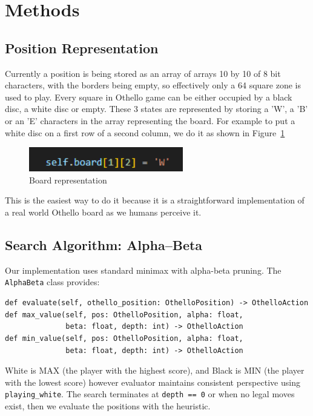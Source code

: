 \documentclass[10pt, titlepage, oneside, a4paper]{article}
\begin{document}
\section{Methods}
\label{sec:methods}


\subsection{Position Representation}
Currently a position is being stored as an array of arrays 10 by 10 of 8 bit characters, with the borders being empty, so effectively only a 64 square zone is used to play. 
Every square in Othello game can be either occupied by a black disc, a white disc or empty. These 3 states are represented by storing a 'W', a 'B' or an 'E' characters in the array representing the board.
For example to put a white disc on a first row of a second column, we do it as shown in Figure~\ref{fig:board_representation}
\begin{figure}[h]
    \centering
    \includegraphics[width=0.6\textwidth]{img/board_representation}
    \caption{Board representation}
    \label{fig:board_representation}
\end{figure}
This is the easiest way to do it because it is a straightforward implementation of a real world Othello board as we humans perceive it. 

\subsection{Search Algorithm: Alpha--Beta}

Our implementation uses standard minimax with alpha-beta pruning. The \texttt{AlphaBeta} class provides:
\begin{verbatim}
def evaluate(self, othello_position: OthelloPosition) -> OthelloAction
def max_value(self, pos: OthelloPosition, alpha: float, 
              beta: float, depth: int) -> OthelloAction
def min_value(self, pos: OthelloPosition, alpha: float, 
              beta: float, depth: int) -> OthelloAction
\end{verbatim}

White is MAX (the player with the highest score), and Black is MIN (the player with the lowest score) however evaluator maintains consistent perspective using \texttt{playing\_white}. The search terminates at \texttt{depth == 0} or when no legal moves exist, then we evaluate the positions with the heuristic.
\end{document}
